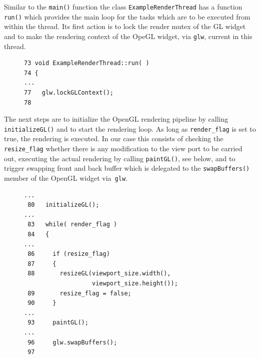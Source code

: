 \documentclass[jou,noapacite]{apa}
\begin{document}
Similar to the \lstinline|main()| function the
class \lstinline|ExampleRenderThread| has a function \lstinline|run()| which
provides the main loop for the tasks which are to be executed from within the
thread.
%
Its first action is to lock the render mutex of the GL widget and to make the
rendering context of the OpeGL widget, via \lstinline|glw|, current in this
thread.
%
\begin{figure}[h]
\begin{lstlisting}[basicstyle=\scriptsize]
73 void ExampleRenderThread::run( )
74 {
...
77   glw.lockGLContext();
78
\end{lstlisting}
\end{figure}
%
The next steps are to initialize the OpenGL rendering pipeline by
calling \lstinline|initializeGL()| and to start the rendering loop.
%
As long as \lstinline|render_flag| is set to true, the rendering is executed.
%
In our case this consists of checking the \lstinline|resize_flag| whether there
is any modification to the view port to be carried out, executing the actual
rendering by calling \lstinline|paintGL()|, see below, and to trigger swapping
front and back buffer which is delegated to the \lstinline|swapBuffers()| member
of the OpenGL widget via~\lstinline|glw|.
%
\begin{figure}[h]
\begin{lstlisting}[basicstyle=\scriptsize]
...
 80   initializeGL();
...
 83   while( render_flag )
 84   {
...
 86     if (resize_flag)
 87     {
 88       resizeGL(viewport_size.width(),
                   viewport_size.height());
 89       resize_flag = false;
 90     }
...
 93     paintGL();
...
 96     glw.swapBuffers();
 97
\end{lstlisting}
\end{figure}
\end{document}
